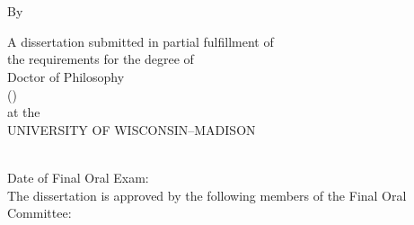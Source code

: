 
\begin{titlepage}
    \begin{center}
        \vspace*{1cm}
        \begin{doublespacing}
        \Huge
        \textbf{\thesistitle} \\
        \LARGE
        \thesissubtitle\\
        \vspace{0.5cm}
        By\\        
        \textbf{\myname}
        
        \vfill
        \normalsize
        A dissertation submitted in partial fulfillment of\\
        the requirements for the degree of\\
        Doctor of Philosophy\\
        (\department) \\
        at the\\
        UNIVERSITY OF WISCONSIN--MADISON\\
        \thesisyear \\
        \end{doublespacing}
        \vspace{1.0cm}
        \begin{flushleft}
        \normalsize
        Date of Final Oral Exam:  \examdate \\
        The dissertation is approved by the following members of the Final Oral Committee:\\
        \setlength{\parindent}{10ex}
        \comI \\
        \comII \\
        \comIII \\
        \comIV \\
        \comV \\
        \end{flushleft}
        
    \end{center}
\end{titlepage}
\restoregeometry